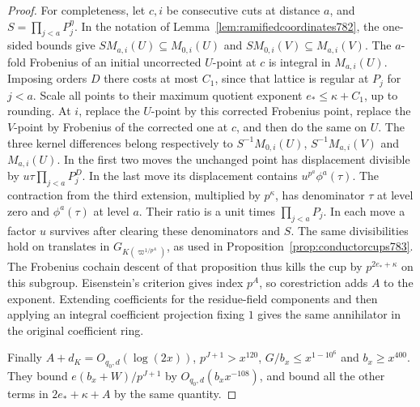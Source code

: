 \documentclass[a4paper,11pt]{article}
\theoremstyle{definition}
\theoremstyle{remark}
\numberwithin{equation}{section}
\begin{document}
\begin{proof}
For completeness, let \(c,i\) be consecutive cuts at distance
\(a\), and \(S=\prod_{j<a}P_j^\eta\). In the notation of
Lemma~\ref{lem:ramifiedcoordinates782}, the one-sided bounds
give \(S M_{a,i}(U)\subseteq M_{0,i}(U)\) and
\(S M_{0,i}(V)\subseteq M_{a,i}(V)\). The \(a\)-fold
Frobenius of an initial uncorrected \(U\)-point at \(c\)
is integral in \(M_{a,i}(U)\). Imposing orders \(D\) there
costs at most \(C_1\), since that lattice is regular at
\(P_j\) for \(j<a\). Scale all points to their maximum
quotient exponent \(e_*\le\kappa+C_1\), up to rounding.
At \(i\), replace the \(U\)-point by this corrected
Frobenius point, replace the \(V\)-point by Frobenius of
the corrected one at \(c\), and then do the same on \(U\).
The three kernel differences belong respectively to
\(S^{-1}M_{0,i}(U)\), \(S^{-1}M_{a,i}(V)\) and \(M_{a,i}(U)\).
In the first two moves the unchanged point has displacement
divisible by \(u\tau\prod_{j<a}P_j^D\).
In the last move its displacement contains
\(u^{p^a}\phi^a(\tau)\).
The contraction from the third extension, multiplied by
\(p^\kappa\), has denominator \(\tau\) at level zero and
\(\phi^a(\tau)\) at level \(a\). Their ratio is a unit
times \(\prod_{j<a}P_j\). In each move a factor \(u\)
survives after clearing these denominators and \(S\).
The same divisibilities hold on translates in
\(G_{K(\varpi^{1/p^A})}\), as used in
Proposition~\ref{prop:conductorcups783}.
The Frobenius cochain descent of that proposition thus
kills the cup by \(p^{2e_*+\kappa}\) on this subgroup.
Eisenstein's criterion gives index \(p^A\), so
corestriction adds \(A\) to the exponent. Extending
coefficients for the residue-field components and then
applying an integral coefficient projection fixing \(1\)
gives the same annihilator in the original coefficient ring.

Finally \(A+d_K=O_{q_0,d}(\log(2x))\), \(p^{J+1}>x^{120}\),
\(G/b_x\le x^{1-10^6}\) and \(b_x\ge x^{400}\).
They bound \(e(b_x+W)/p^{J+1}\) by \(O_{q_0,d}(b_xx^{-108})\),
and bound all the other terms in \(2e_*+\kappa+A\) by the
same quantity.
\end{proof}
\end{document}
